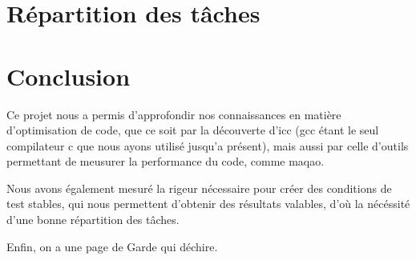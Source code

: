 \section*{Répartition des tâches}


\section*{Conclusion}
Ce projet nous a permis d'approfondir nos connaissances en matière d'optimisation de code, que ce soit par la découverte d'icc (gcc étant le seul compilateur c que nous ayons utilisé jusqu'a présent), mais aussi par celle d'outils permettant de meusurer la performance du code, comme maqao.

Nous avons également mesuré la rigeur nécessaire pour créer des conditions de test stables, qui nous permettent d'obtenir des résultats valables, d'où la nécéssité d'une bonne répartition des tâches.

Enfin, on a une page de Garde qui déchire.
